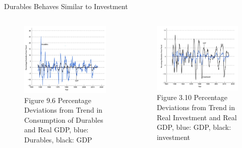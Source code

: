 \documentclass[11pt,aspectratio=43]{beamer}
\theoremstyle{definition}
\begin{document}
\begin{frame}{Durables Behaves Similar to Investment}
\label{slide:Durables_Behaves_Similar_to_Investment}
    \begin{columns}
        \begin{column}{0.5\textwidth}
            \begin{figure}
                \caption{\scriptsize Figure 9.6  Percentage Deviations from Trend in Consumption of Durables and Real GDP, \alert{blue: Durables}, black: GDP}
                \includegraphics[width=\textwidth]{./figures/Figure9_6.jpg}
            \end{figure}
        \end{column}
        \begin{column}{0.5\textwidth}
            \begin{figure}
                \caption{\scriptsize Figure 3.10 Percentage Deviations from Trend in \alert{Real Investment} and Real GDP, \alert{blue: GDP}, black: investment}
                \includegraphics[width=\textwidth]{../Lecture_03/figures/Figure3_10.jpg}
            \end{figure}
        \end{column}
    \end{columns}
\end{frame}
\end{document}
